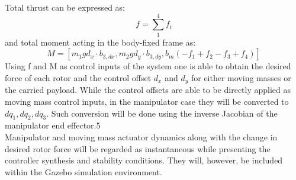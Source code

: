Total thrust can be expressed as:
\begin{equation}
	f = \sum_{1}^{4}f_i
\end{equation}
and total moment acting in the body-fixed frame as:
\begin{equation}
	M = [m_{1}gd_x \cdot b_{3,dx} ,m_{2}gd_y \cdot b_{3,dy},b_m(-f_1 + f_2 - f_3 + f_4)]
\end{equation}
Using f and M as control inputs of the system one is able to obtain the desired force of each rotor and the control offset $d_x$ and $d_y$ for either moving masses or the carried payload. While the control offsets are able to be directly applied as moving mass control inputs, in the manipulator case they will be converted to $dq_1, dq_2, dq_3$. Such conversion will be done using the inverse Jacobian of the manipulator end effector.5\\
Manipulator and moving mass actuator dynamics along with the change in desired rotor force will be regarded as instantaneous while presenting the controller synthesis and stability conditions. They will, however, be included within the Gazebo simulation environment.